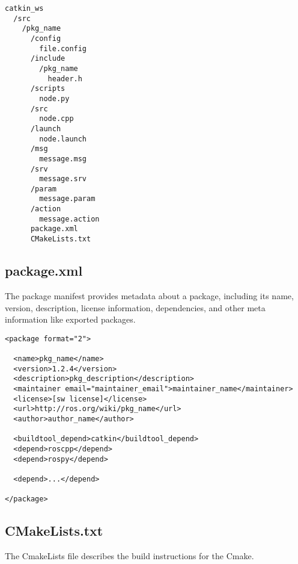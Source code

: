 \begin{verbatim}
catkin_ws
  /src
    /pkg_name
      /config
        file.config
      /include
        /pkg_name
          header.h
      /scripts
        node.py
      /src
        node.cpp
      /launch
        node.launch
      /msg
        message.msg
      /srv
        message.srv
      /param
        message.param
      /action
        message.action
      package.xml
      CMakeLists.txt
\end{verbatim}




    
        \subsection{package.xml}
            The package manifest provides metadata about a package, including its name, version, description, license information, dependencies, and other meta information like exported packages.
    
\begin{verbatim}
<package format="2">

  <name>pkg_name</name>
  <version>1.2.4</version>
  <description>pkg_description</description>
  <maintainer email="maintainer_email">maintainer_name</maintainer>
  <license>[sw license]</license>
  <url>http://ros.org/wiki/pkg_name</url>
  <author>author_name</author>

  <buildtool_depend>catkin</buildtool_depend>
  <depend>roscpp</depend>
  <depend>rospy</depend>

  <depend>...</depend>

</package>
\end{verbatim}
    
    
    
        \subsection{CMakeLists.txt}
            The CmakeLists file describes the build instructions for the Cmake.

